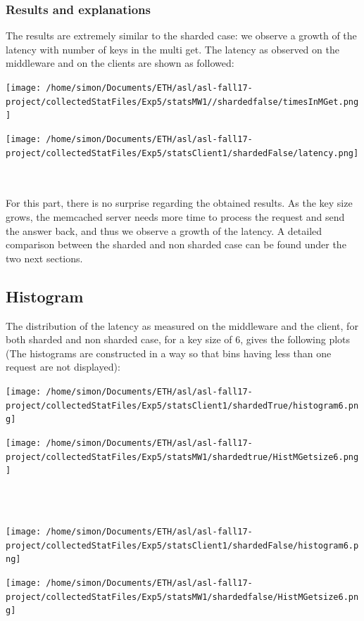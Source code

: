 \documentclass[11pt,a4paper]{article}
\begin{document}
\subsubsection{Results and explanations}

The results are extremely similar to the sharded case: we observe a growth of the latency with number of keys in the multi get. The latency as observed on the middleware and on the clients are shown as followed: 
\\
\begin{minipage}{0.5\linewidth}
\texttt{[image: /home/simon/Documents/ETH/asl/asl-fall17-project/collectedStatFiles/Exp5/statsMW1//shardedfalse/timesInMGet.png]}
\end{minipage}
\hfill
\begin{minipage}{0.5\linewidth}
\texttt{[image: /home/simon/Documents/ETH/asl/asl-fall17-project/collectedStatFiles/Exp5/statsClient1/shardedFalse/latency.png]}
\end{minipage}
\\\\
For this part, there is no surprise regarding the obtained results. As the key size grows, the memcached server needs more time to process the request and send the answer back, and thus we observe a growth of the latency. A detailed comparison between the sharded and non sharded case can be found under the two next sections. 

\subsection{Histogram}

The distribution of the latency as measured on the middleware and the client, for both sharded and non sharded case, for a key size of 6, gives the following plots (The histograms are constructed in a way so that bins having less than one request are not displayed):
\\
\begin{minipage}{0.5\linewidth}
\texttt{[image: /home/simon/Documents/ETH/asl/asl-fall17-project/collectedStatFiles/Exp5/statsClient1/shardedTrue/histogram6.png]}
\end{minipage}
\hfill
\begin{minipage}{0.5\linewidth}
\texttt{[image: /home/simon/Documents/ETH/asl/asl-fall17-project/collectedStatFiles/Exp5/statsMW1/shardedtrue/HistMGetsize6.png]}
\end{minipage}
\\
\\
\begin{minipage}{0.5\linewidth}
\texttt{[image: /home/simon/Documents/ETH/asl/asl-fall17-project/collectedStatFiles/Exp5/statsClient1/shardedFalse/histogram6.png]}
\end{minipage}
\hfill
\begin{minipage}{0.5\linewidth}
\texttt{[image: /home/simon/Documents/ETH/asl/asl-fall17-project/collectedStatFiles/Exp5/statsMW1/shardedfalse/HistMGetsize6.png]}
\end{minipage}
\end{document}
